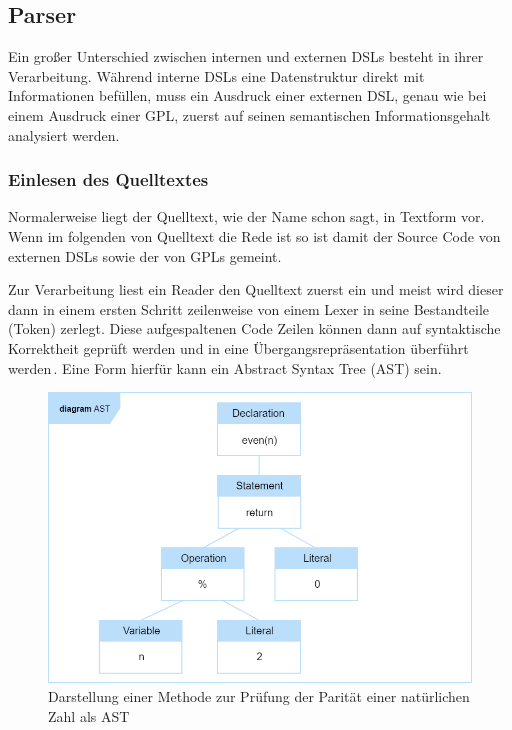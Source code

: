 \documentclass[12pt,oneside,a4paper,parskip]{scrbook}
\begin{document}
\subsection{Parser}

Ein großer Unterschied zwischen internen und externen DSLs besteht in ihrer Verarbeitung. Während interne DSLs eine Datenstruktur direkt mit Informationen befüllen, muss ein Ausdruck einer externen DSL, genau wie bei einem Ausdruck einer GPL, zuerst auf seinen semantischen Informationsgehalt analysiert werden.

\subsubsection{Einlesen des Quelltextes}

Normalerweise liegt der Quelltext, wie der Name schon sagt, in Textform vor. Wenn im folgenden von Quelltext die Rede ist so ist damit der Source Code von externen DSLs sowie der von GPLs gemeint. 

Zur Verarbeitung liest ein Reader den Quelltext zuerst ein und meist wird dieser dann in einem ersten Schritt zeilenweise von einem Lexer in seine Bestandteile (Token) zerlegt. Diese aufgespaltenen Code Zeilen können dann auf syntaktische Korrektheit geprüft werden und in eine Übergangsrepräsentation überführt werden\,\cite[S. 29f.]{parr2009}. Eine Form hierfür kann ein Abstract Syntax Tree (AST) sein.

\begin{figure}[htbp]
	\centering
	\includegraphics[width=1.0\textwidth]{bilder/ast}
	\caption{Darstellung einer Methode zur Prüfung der Parität einer natürlichen Zahl als AST}
	\label{fig:ast}
\end{figure}
\end{document}
